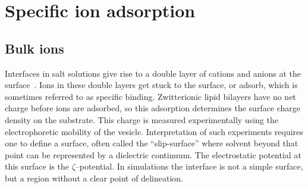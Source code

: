 \documentclass[12pt,openany,final]{book}
\begin{document}
\section{Specific ion adsorption}
\subsection{Bulk ions}

Interfaces in salt solutions give rise to a double layer of cations and anions at the surface~\cite{israelachvili:2011:intermol}. 
Ions in these double layers get stuck to the surface, or adsorb, which is sometimes referred to as specific binding. Zwitterionic lipid bilayers have no net charge before ions are adsorbed,
so this adsorption
determines the surface charge density on the substrate. This charge is measured experimentally using the electrophoretic mobility of the vesicle. Interpretation
of such experiments requires one to define a surface, often called the ``slip-surface'' where solvent 
beyond that point
can be represented by a dielectric continuum. The electrostatic potential at this surface is the $\zeta$--potential.
In simulations the interface is not a simple surface, but a region {without a clear point of delineation}. 
\end{document}
